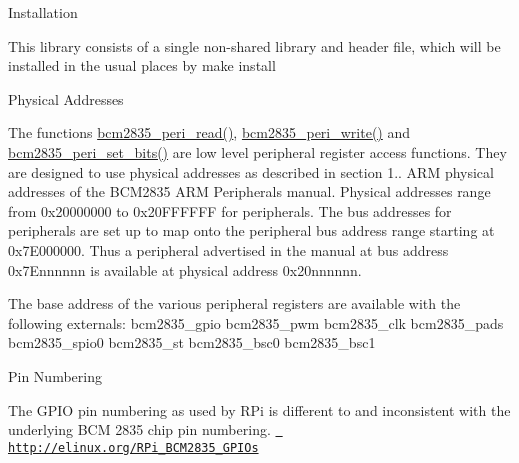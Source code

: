 \begin{DoxyParagraph}{Installation}

\end{DoxyParagraph}
This library consists of a single non-\/shared library and header file, which will be installed in the usual places by make install


\begin{DoxyCode}{0}
\DoxyCodeLine{\textcolor{preprocessor}{\#\ download\ the\ latest\ version\ of\ the\ library,\ say\ bcm2835-\/1.xx.tar.gz,\ then:}}

\end{DoxyCode}


\begin{DoxyParagraph}{Physical Addresses}

\end{DoxyParagraph}
The functions \mbox{\hyperlink{group__lowlevel_ga5f242135f5088f8c319492426a1ed5e3}{bcm2835\+\_\+peri\+\_\+read()}}, \mbox{\hyperlink{group__lowlevel_ga639da6963ab76e3109b9909f3a9e6171}{bcm2835\+\_\+peri\+\_\+write()}} and \mbox{\hyperlink{group__lowlevel_ga01949a6285305f38ce0a47154e55c1b6}{bcm2835\+\_\+peri\+\_\+set\+\_\+bits()}} are low level peripheral register access functions. They are designed to use physical addresses as described in section 1.. ARM physical addresses of the BCM2835 ARM Peripherals manual. Physical addresses range from 0x20000000 to 0x20\+FFFFFF for peripherals. The bus addresses for peripherals are set up to map onto the peripheral bus address range starting at 0x7\+E000000. Thus a peripheral advertised in the manual at bus address 0x7\+Ennnnnn is available at physical address 0x20nnnnnn.

The base address of the various peripheral registers are available with the following externals\+: bcm2835\+\_\+gpio bcm2835\+\_\+pwm bcm2835\+\_\+clk bcm2835\+\_\+pads bcm2835\+\_\+spio0 bcm2835\+\_\+st bcm2835\+\_\+bsc0 bcm2835\+\_\+bsc1

\begin{DoxyParagraph}{Pin Numbering}

\end{DoxyParagraph}
The GPIO pin numbering as used by RPi is different to and inconsistent with the underlying BCM 2835 chip pin numbering. \href{http://elinux.org/RPi_BCM2835_GPIOs}{\texttt{ http\+://elinux.\+org/\+RPi\+\_\+\+BCM2835\+\_\+\+GPIOs}}

